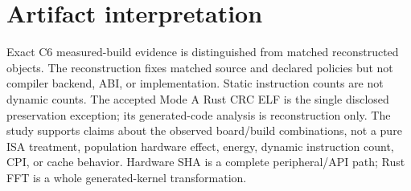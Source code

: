 \documentclass[10pt]{article}
\begin{document}
\section{Artifact interpretation}
Exact C6 measured-build evidence is distinguished from matched reconstructed objects. The reconstruction fixes matched source and declared policies but not compiler backend, ABI, or implementation. Static instruction counts are not dynamic counts. The accepted Mode A Rust CRC ELF is the single disclosed preservation exception; its generated-code analysis is reconstruction only. The study supports claims about the observed board/build combinations, not a pure ISA treatment, population hardware effect, energy, dynamic instruction count, CPI, or cache behavior. Hardware SHA is a complete peripheral/API path; Rust FFT is a whole generated-kernel transformation.
\end{document}
